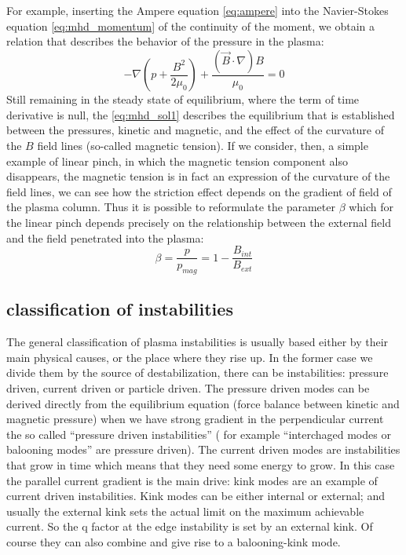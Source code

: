 For example, inserting the Ampere equation \eqref{eq:ampere} into the Navier-Stokes equation \eqref{eq:mhd_momentum} of the continuity of the moment, we obtain a relation that describes the behavior of the pressure in the plasma:
\begin{equation}
 \label{eq:mhd_sol1}
 -\nabla \left( p+\frac{B^2}{2\mu_0} \right) + \frac{
  (\Vec{B}\cdot\nabla)B}{\mu_0} = 0
\end{equation}
Still remaining in the steady state of equilibrium, where the term of time derivative is null, the \eqref{eq:mhd_sol1} describes the equilibrium that is established between the pressures, kinetic and magnetic, and the effect of the curvature of the ${B}$ field lines (so-called magnetic tension). If we consider, then, a simple example of linear pinch, in which the magnetic tension component also disappears, the magnetic tension is in fact an expression of the curvature of the field lines, we can see how the striction effect depends on the gradient of field of the plasma column. Thus it is possible to reformulate the parameter $ \beta $ which for the linear pinch depends precisely on the relationship between the external field and the field penetrated into the plasma:
\begin{equation}
\beta = \frac{p}{p_{mag}} = 1-\frac{B_{int}}{B_{ext}}
\end{equation}



\subsection{classification of instabilities}
\label{sez:classificazione}

The general classification of plasma instabilities is usually based either by their main physical causes, or the place where they rise up.
%
In the former case we divide them by the source of destabilization, there can be instabilities: pressure driven, current driven or particle driven. 
The pressure driven modes can be derived directly from the equilibrium equation (force balance between kinetic and magnetic pressure) when we have strong gradient in the perpendicular current the so called “pressure driven instabilities” ( for example “interchaged modes or balooning modes” are pressure driven).
The current driven modes are instabilities that grow in time which means that they need some energy to grow. In this case the parallel current gradient is the main drive: kink modes are an example of current driven instabilities. Kink modes can be either internal or external; and usually the external kink sets the actual limit on the maximum achievable current. So the q factor at the edge instability is set by an external kink. Of course they can also combine and give rise to a balooning-kink mode.

